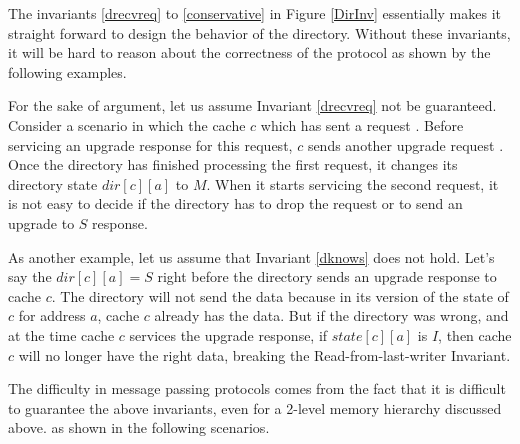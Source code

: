 The invariants \ref{drecvreq} to \ref{conservative} in Figure \ref{DirInv}
essentially makes it straight forward to design the behavior of the directory.
Without these invariants, it will be hard to reason about the correctness of the
protocol as shown by the following examples.

For the sake of argument, let us assume Invariant \ref{drecvreq} not be
guaranteed. Consider a scenario in which the cache $c$ which has sent a request
. Before servicing an upgrade response for this request, $c$
sends another upgrade request . Once the directory has
finished processing the first request, it changes its directory state
$dir[c][a]$ to $M$. When it starts servicing the second request, it is not easy
to decide if the directory has to drop the request or to send an upgrade to $S$
response.

As another example, let us assume that Invariant \ref{dknows} does not hold.
Let's say the $dir[c][a] = S$ right before the directory sends an upgrade
response  to cache $c$. The directory will not send the data
because in its version of the state of $c$ for address $a$, cache $c$ already
has the data. But if the directory was wrong, and at the time cache $c$ services
the upgrade response, if $state[c][a]$ is $I$, then cache $c$ will no longer
have the right data, breaking the Read-from-last-writer Invariant.

The difficulty in message passing protocols comes from the fact that it is
difficult to guarantee the above invariants, even for a 2-level memory hierarchy
discussed above. as shown in the following scenarios.


%

